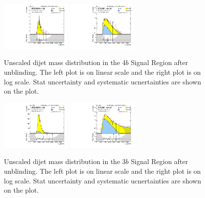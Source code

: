 \begin{figure}[htbp!]
\begin{center}
\includegraphics[width=0.31\textwidth,angle=-90]{figures/boosted/Signal_Syst/Moriond_bkg_9_FourTag_Signal_mHH_l.pdf}
\includegraphics[width=0.31\textwidth,angle=-90]{figures/boosted/Signal_Syst/Moriond_bkg_9_FourTag_Signal_mHH_l_1.pdf}
  \caption{Unscaled dijet mass distribution in the 4$b$ Signal Region after unblinding. The left plot is on linear scale and the right plot is on log scale. Stat uncertainty and systematic ucnertainties are shown on the plot.}
  \label{fig:boosted-4b-signal-l}
\end{center}
\end{figure}

\begin{figure}[htbp!]
\begin{center}
\includegraphics[width=0.31\textwidth,angle=-90]{figures/boosted/Signal_Syst/Moriond_bkg_9_ThreeTag_Signal_mHH_l.pdf}
\includegraphics[width=0.31\textwidth,angle=-90]{figures/boosted/Signal_Syst/Moriond_bkg_9_ThreeTag_Signal_mHH_l_1.pdf}  
  \caption{Unscaled dijet mass distribution in the 3$b$ Signal Region after unblinding. The left plot is on linear scale and the right plot is on log scale. Stat uncertainty and systematic ucnertainties are shown on the plot.}
  \label{fig:boosted-3b-signal-l}
\end{center}
\end{figure}

